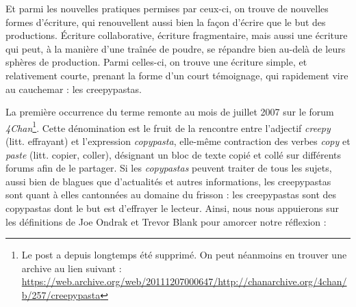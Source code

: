 \documentclass[12pt,a4paper,oneside,titlepage]{book} %
\begin{document}
Et parmi les nouvelles pratiques permises par ceux-ci, on trouve de nouvelles formes d'écriture, qui renouvellent aussi bien la façon d’écrire que le but des productions. Écriture collaborative, écriture fragmentaire, mais aussi une écriture qui peut, à la manière d'une traînée de poudre, se répandre bien au-delà de leurs sphères de production. Parmi celles-ci, on trouve une écriture simple, et relativement courte, prenant la forme d'un court témoignage, qui rapidement vire au cauchemar : les creepypastas. 
\par
	La première occurrence du terme remonte au mois de juillet 2007 sur le forum \emph{4Chan}\footnote{Le post a depuis longtemps été supprimé. On peut néanmoins en trouver une archive au lien suivant : \url{https://web.archive.org/web/20111207000647/http://chanarchive.org/4chan/b/257/creepypasta}}. Cette dénomination est le fruit de la rencontre entre l'adjectif \emph{creepy} (litt. effrayant) et l'expression \emph{copypasta}, elle-même contraction des verbes \emph{copy} et \emph{paste} (litt. copier, coller), désignant un bloc de texte copié et collé sur différents forums afin de le partager. Si les \emph{copypastas} peuvent traiter de tous les sujets, aussi bien de blagues que d'actualités et autres informations, les creepypastas sont quant à elles cantonnées au domaine du frisson : les creepypastas sont des copypastas dont le but est d'effrayer le lecteur. Ainsi, nous nous appuierons sur les définitions de Joe Ondrak et Trevor Blank pour amorcer notre réflexion :
    
\end{document}
